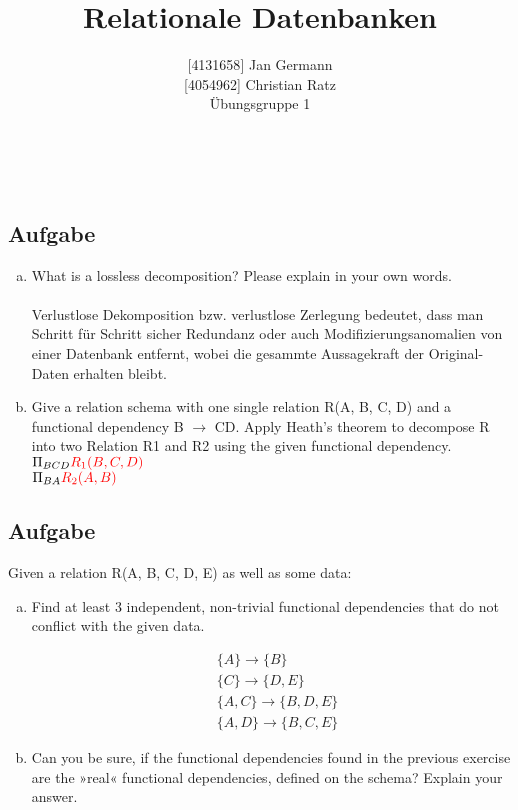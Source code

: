 \documentclass[11pt,a4paper,DIV=9]{scrartcl}
\author{{[}4131658{]} Jan Germann \\{[}4054962{]} Christian Ratz\\Übungsgruppe 1}
\title{Relationale Datenbanken}
\newcounter{temp}
\newcommand{\aufgabe}[1]{
  \setcounter{temp}{\value{subsection}}
  \setcounter{subsection}{#1}
  \addtocounter{subsection}{-1}
  \subsection{Aufgabe}
  \setcounter{subsection}{\value{temp}}
}
\renewcommand{\author}[1]{\renewcommand{\author}{#1}}
\renewcommand{\title}[1]{\renewcommand{\title}{#1}}
\newcommand{\makehomeworktitle}{
  \begin{minipage}[t]{6.5cm}
    \sf{\author}
  \end{minipage}
  \begin{minipage}[t]{6.5cm}
    \begin{flushright}
      \sf{\title\\\today}
    \end{flushright}
  \end{minipage}
  \\[0.2cm]
  \begin{center}
    \sf{
      \color{blue}{
        \LARGE{Aufgabenblatt \blattnr}
      }
    }
  \end{center}
  \vspace{0.1cm}
}
\begin{document}
\makehomeworktitle
\aufgabe{1}
  \begin{enumerate}[a.]
    \item What is a lossless decomposition? Please explain in your own words. \\\\
    Verlustlose Dekomposition bzw. verlustlose Zerlegung bedeutet, dass man Schritt f\"ur Schritt sicher Redundanz oder auch Modifizierungsanomalien von einer Datenbank entfernt, wobei die gesammte Aussagekraft der Original-Daten erhalten bleibt.
    \item Give a relation schema with one single relation R(A, B, C, D) and a functional dependency B $  \rightarrow $  CD. Apply Heath's theorem to decompose R into two Relation R1 and R2 using the given functional dependency. \\
    $ \Pi_{BCD} \textcolor{red}{R_{1} (B,C,D)} $ \\
    $ \Pi_{BA} \textcolor{red}{R_{2} (A,B)} $ \\
  \end{enumerate}

\aufgabe{2}
  Given a relation R(A, B, C, D, E) as well as some data:
  \begin{enumerate}[a.]
    \item Find at least 3 independent, non-trivial functional dependencies that do not conflict with the given data.

    \begin{align}
      &\{A\}       \rightarrow \{B\}\\
      &\{C\}       \rightarrow \{D,E\}\\
      &\{A, C\}    \rightarrow \{B,D,E\}\\ 
      &\{A, D\}    \rightarrow \{B,C,E\}
    \end{align}

   \item Can you be sure, if the functional dependencies found in the previous exercise are the »real« functional dependencies, defined on the schema? Explain your answer.
  \end{enumerate}
\end{document}
